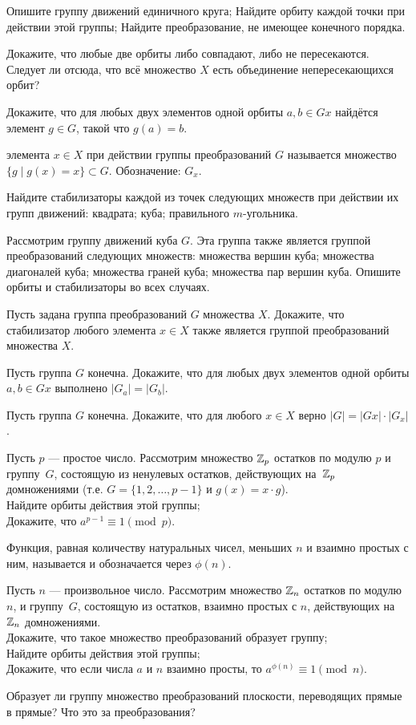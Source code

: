 \documentclass[a4paper,12pt]{article}
\begin{document}
Опишите группу движений единичного круга;
Найдите орбиту каждой точки при действии этой группы;
Найдите преобразование, не имеющее конечного порядка.

Докажите, что любые две орбиты либо совпадают, либо не пересекаются. Следует ли отсюда,
что всё множество $X$ есть объединение непересекающихся орбит?

Докажите, что для любых двух элементов одной орбиты $a,b \in Gx$ найдётся элемент $g \in G$,
такой что $g(a) = b$.


  элемента $x \in X$ при действии группы преобразований $G$ называется
множество $\{g \mid g(x)=x\} \subset G$.
 Обозначение: $G_x$.

Найдите стабилизаторы каждой из точек следующих множеств при действии их групп движений:
квадрата;
куба;
правильного $m$-угольника.

Рассмотрим группу движений куба $G$. Эта группа также является группой преобразований следующих множеств:
 множества вершин куба;
 множества диагоналей куба;
 множества граней куба;
 множества пар вершин куба.
Опишите орбиты и стабилизаторы во всех случаях.

Пусть задана группа преобразований $G$ множества $X$. Докажите, что стабилизатор
любого элемента $x\in X$ также является группой преобразований множества $X$.

Пусть группа $G$ конечна. Докажите, что для любых двух элементов одной орбиты $a,b \in Gx$ выполнено $|G_a| = |G_b|$.

Пусть группа $G$ конечна. Докажите, что для любого $x \in X$ верно $|G| = |Gx| \cdot |G_x|$.

Пусть $p$ --- простое число.
Рассмотрим множество $\mathbb{Z}_p$ остатков по модулю $p$ и группу~$G$, состоящую из ненулевых остатков, действующих на~$\mathbb{Z}_p$ домножениями (т.е. $G=\{1, 2,\ldots,p-1\}$ и $g(x) = x\cdot g$).
\\ Найдите орбиты действия этой группы;
\\ Докажите, что $a^{p-1} \equiv 1 \pmod{p}$.

Функция, равная количеству натуральных чисел, меньших $n$ и взаимно простых с ним, называется  и обозначается через $\phi(n)$.

Пусть $n$ --- произвольное число.
Рассмотрим множество $\mathbb{Z}_n$ остатков по модулю $n$, и группу~$G$, состоящую из остатков, взаимно простых с $n$, действующих на~$\mathbb{Z}_n$ домножениями.
\\ Докажите, что такое множество преобразований образует группу;
\\ Найдите орбиты действия этой группы;
\\
Докажите, что если числа $a$ и $n$ взаимно просты, то $a^{\phi(n)} \equiv 1\pmod{n}$.

Образует ли группу множество преобразований плоскости, переводящих прямые в прямые? Что это за преобразования?


\end{document}
